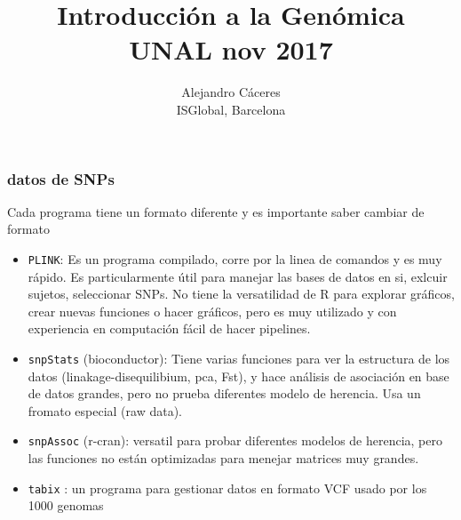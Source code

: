 \documentclass{beamer}\usepackage[]{graphicx}\usepackage[]{color}
\begin{document}
\title{Introducci\'on a la Gen\'omica \\ UNAL nov 2017}
\author{Alejandro C\'aceres \\ ISGlobal, Barcelona}


\maketitle


\begin{frame}[fragile]
\frametitle{datos de SNPs}
Cada programa tiene un formato diferente y es importante saber cambiar de formato
\begin{itemize}
\item {\tt PLINK}: Es un programa compilado, corre por la linea de comandos y es muy r\'apido. Es particularmente \'util para manejar las bases de datos en si, exlcuir sujetos, seleccionar SNPs. No tiene la versatilidad de R para explorar gr\'aficos, crear nuevas funciones o hacer gr\'aficos, pero es muy utilizado y con experiencia en computaci\'on f\'acil de hacer pipelines.

\item {\tt snpStats} (bioconductor): Tiene varias funciones para ver la estructura de los datos (linakage-disequilibium, pca, Fst), y hace an\'alisis de asociaci\'on en base de datos grandes, pero no prueba diferentes modelo de herencia. Usa un fromato especial (raw data).

\item {\tt snpAssoc} (r-cran): versatil para probar diferentes modelos de herencia, pero las funciones no est\'an optimizadas para menejar matrices muy grandes. 

\item {\tt tabix} : un programa para gestionar datos en formato VCF usado por los 1000 genomas  
 
\end{itemize}
\end{frame}
\end{document}
